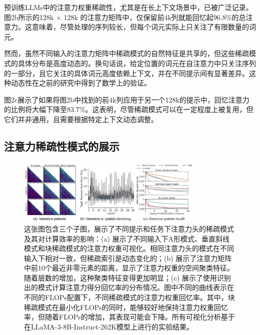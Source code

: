 \documentclass[twocolumn, 10pt]{article} %
\theoremstyle{remark}
\begin{document}
预训练LLMs中的注意力权重稀疏性，尤其是在长上下文场景中，已被广泛记录。图2b所示的128k $\times$ 128k 的注意力矩阵中，仅保留前4k列就能回忆起96.8\%的总注意力。这意味着，尽管处理的序列较长，但每个词元实际上只关注了有限数量的词元。

然而，虽然不同输入的注意力矩阵中稀疏模式的自然特征是共享的，但这些稀疏模式的具体分布是高度动态的。换句话说，给定位置的词元在自注意力中只关注序列的一部分，且它关注的具体词元高度依赖上下文，并在不同提示间有显著差异。这种动态性在之前的研究中得到了数学上的验证。

图2c展示了如果将图2b中找到的前4k列应用于另一个128k的提示中，回忆注意力的比例将大幅下降至83.7\%。这表明，尽管稀疏模式可以在一定程度上被复用，但它们并非通用，且需要根据特定上下文动态调整。



\subsection{注意力稀疏性模式的展示}
\begin{figure}[ht]
    \centering
    \includegraphics[width=0.8\textwidth]{visualization_of_attention_weights.png}
    \caption{
        这张图包含三个子图，展示了不同提示和任务下注意力头的稀疏模式及其对计算效率的影响：(a) 展示了不同输入下A形模式、垂直斜线模式和块稀疏模式的注意力权重可视化。相同注意力头的模式在不同输入下相对一致，但稀疏索引是动态变化的；(b) 展示了注意力矩阵中前10个最近非零元素的距离，显示了注意力权重的空间聚类特征。随着层数的增加，这种聚类特征变得更加明显；(c) 展示了使用识别出的模式计算注意力得分回忆率的分布情况。图中不同的曲线表示在不同的FLOPs配置下，不同稀疏模式的注意力权重回忆率。其中，块稀疏模式在最小化FLOPs的同时，能够较好地保持注意力权重回忆率，但随着FLOPs的增加，其表现可能会下降。所有可视化分析基于在LLaMA-3-8B-Instruct-262K模型上进行的实验结果。
    }
\end{figure}
\end{document}
